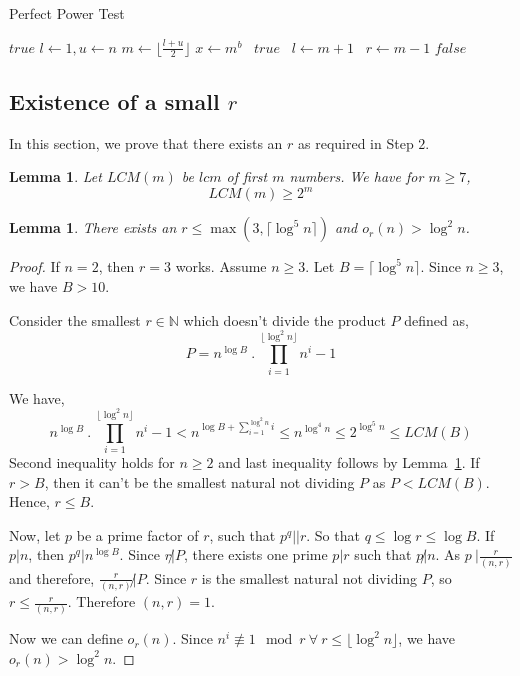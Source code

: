 \documentclass[11pt]{article}
\newtheorem{lemma}[theorem]{Lemma}
\begin{document}
\begin{algorithm}
\caption{Perfect Power Test}
\label{alg:PerfectPowerTest}
\begin{algorithmic}
	\State \Return $true$
\EndIf
{}
	\State $l \gets 1, u \gets n$
		\State $m \gets \lfloor \frac{l+u}{2} \rfloor$
		\State $x \gets m^b$ 
			\ \Return $true$
			\ $l \gets m+1$
		\Else
			\ $r \gets m-1$
		\EndIf
	\EndWhile
\EndFor
\State \Return $false$
\EndProcedure
\end{algorithmic}
\end{algorithm}


\subsection {Existence of a small $r$}
In this section, we prove that there exists an $r$ as required in Step $2$.

\begin{lemma}
\label{lemma:LCMLemma}
Let $LCM(m)$ be $lcm$ of first $m$ numbers. We have for $m \geq 7$,
\[LCM(m) \geq 2^m\]
\end{lemma}

\begin{lemma}
\label{lemma:AKSLemma2}
There exists an $r \leq \max(3, \lceil \log^5 n \rceil)$ and $o_r(n) > \log^2 n$.
\end{lemma}
\begin{proof}
If $n = 2$, then $r = 3$ works. Assume $n \geq 3$. Let $B = \lceil \log^5 n \rceil$. Since $n \geq 3$, we have $B > 10$. 

Consider the smallest $r \in \mathbb{N}$ which doesn't divide the product $P$ defined as,
\[P = n^{\log B}\ .\ \prod_{i=1}^{\lfloor \log^2 n \rfloor}{n^i-1} \]

We have,
\[n^{\log B}\ .\ \prod_{i=1}^{\lfloor \log^2 n \rfloor}{n^i-1} < n^{\log B + \sum_{i=1}^{\log^2 n}i} \leq n^{\log^4 n} \leq 2^{\log^5 n} \leq LCM(B)\]
Second inequality holds for $n \geq 2$ and last inequality follows by Lemma~\ref{lemma:LCMLemma}. If $r > B$, then it can't be the smallest natural not dividing $P$ as $P < LCM(B)$. Hence, $r \leq B$.

Now, let $p$ be a prime factor of $r$, such that $p^q || r$. So that $q \leq \log r \leq \log B$. If $p | n$, then $p^q | n^{\log B}$. Since $r \not | P$, there exists one prime $p | r$ such that $p \not | n$. As $p \ |  \frac{r}{(n,r)}$ and therefore, $\frac{r}{(n,r)} \not | P$. Since $r$ is the smallest natural not dividing $P$, so $r \leq \frac{r}{(n,r)}$. Therefore $(n,r) = 1$. 

Now we can define $o_r(n)$. Since $n^i \not \equiv 1 \mod r \ \forall \ r \leq \lfloor \log^2 n \rfloor$, we have $o_r(n) > \log^2 n$.
\end{proof}
\end{document}
